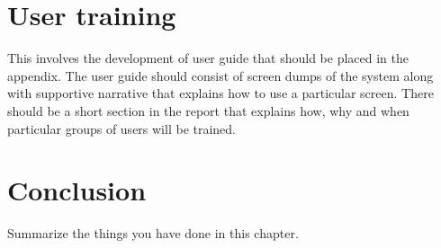 \section{User training} %
\label{sec:user_training}

This involves the development of user guide that should be placed in the appendix. The user guide should consist of screen dumps of the system along with supportive narrative that explains how to use a particular screen. There should be a short section in the report that explains how, why and when particular groups of users will be trained.

\section{Conclusion} %
Summarize the things you have done in this chapter.
